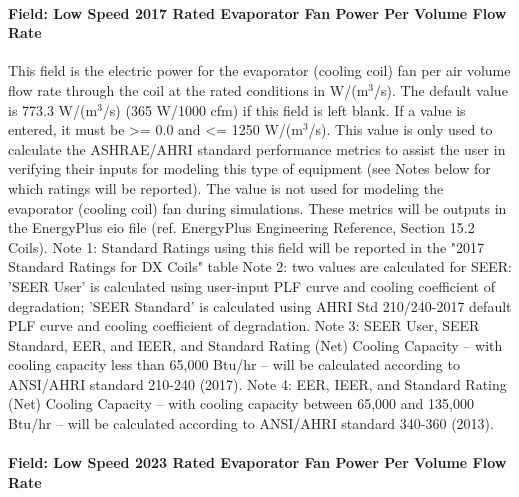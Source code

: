 \paragraph{Field: Low Speed 2017 Rated Evaporator Fan Power Per Volume Flow Rate}

This field is the electric power for the evaporator (cooling coil) fan per air volume flow rate through the coil at the rated conditions in W/(m\(^{3}\)/s). The default value is 773.3 W/(m\(^{3}\)/s) (365 W/1000 cfm) if this field is left blank. If a value is entered, it must be \textgreater{}= 0.0 and \textless{}= 1250 W/(m\(^{3}\)/s). This value is only used to calculate the ASHRAE/AHRI standard performance metrics to assist the user in verifying their inputs for modeling this type of equipment (see Notes below for which ratings will be reported).  The value is not used for modeling the evaporator (cooling coil) fan during simulations.  These metrics will be outputs in the EnergyPlus eio file (ref. EnergyPlus Engineering Reference, Section 15.2 Coils).
Note 1: Standard Ratings using this field will be reported in the "2017 Standard Ratings for DX Coils" table
Note 2: two values are calculated for SEER: 'SEER User' is calculated using user-input PLF curve and cooling coefficient of degradation; 'SEER Standard' is calculated using AHRI Std 210/240-2017 default PLF curve and cooling coefficient of degradation.
Note 3: SEER User, SEER Standard, EER, and IEER, and Standard Rating (Net) Cooling Capacity -- with cooling capacity less than 65,000 Btu/hr -- will be calculated according to ANSI/AHRI standard 210-240 (2017).
Note 4: EER, IEER, and Standard Rating (Net) Cooling Capacity -- with cooling capacity between 65,000 and 135,000 Btu/hr -- will be calculated according to ANSI/AHRI standard 340-360 (2013).

\paragraph{Field: Low Speed 2023 Rated Evaporator Fan Power Per Volume Flow Rate}

